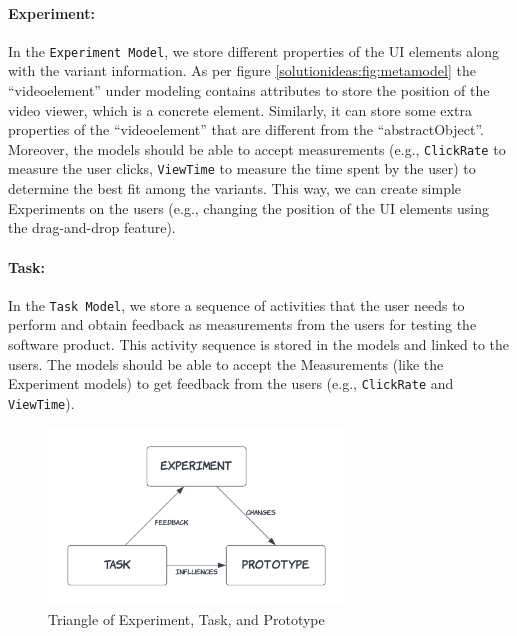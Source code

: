 \paragraph{Experiment:} In the \texttt{Experiment Model}, we store different properties of the UI elements along with the variant information. 
As per figure \ref{solutionideas:fig:metamodel} the ``videoelement'' under modeling contains attributes to store the position of the video viewer, which is a concrete element.
Similarly, it can store some extra properties of the ``videoelement'' that are different from the ``abstractObject''.
Moreover, the models should be able to accept measurements (e.g., \texttt{ClickRate} to measure the user clicks, \texttt{ViewTime} to measure the time spent by the user) to determine the best fit among the variants.
This way, we can create simple Experiments on the users (e.g., changing the position of the UI elements using the drag-and-drop feature).

\paragraph{Task:} In the \texttt{Task Model}, we store a sequence of activities that the user needs to perform and obtain feedback as measurements from the users for testing the software product.
This activity sequence is stored in the models and linked to the users.
The models should be able to accept the Measurements (like the Experiment models) to get feedback from the users (e.g., \texttt{ClickRate} and \texttt{ViewTime}). 

\begin{figure}[h]
	\centering
  \includegraphics[width=0.7\textwidth]{images/solution-ideas/Triangle.png}
	\caption{Triangle of Experiment, Task, and Prototype}
	\label{solutionideas:fig:triangle}
\end{figure}

